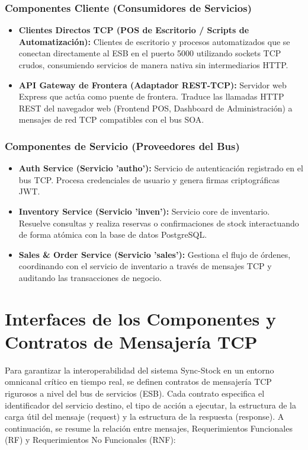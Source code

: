 \documentclass[12pt,a4paper]{article}
\begin{document}
\subsubsection{Componentes Cliente (Consumidores de Servicios)}
\begin{itemize}[leftmargin=*]
    \item \textbf{Clientes Directos TCP (POS de Escritorio / Scripts de Automatización):} Clientes de escritorio y procesos automatizados que se conectan directamente al ESB en el puerto 5000 utilizando sockets TCP crudos, consumiendo servicios de manera nativa sin intermediarios HTTP.
    \item \textbf{API Gateway de Frontera (Adaptador REST-TCP):} Servidor web Express que actúa como puente de frontera. Traduce las llamadas HTTP REST del navegador web (Frontend POS, Dashboard de Administración) a mensajes de red TCP compatibles con el bus SOA.
\end{itemize}

\subsubsection{Componentes de Servicio (Proveedores del Bus)}
\begin{itemize}[leftmargin=*]
    \item \textbf{Auth Service (Servicio 'autho'):} Servicio de autenticación registrado en el bus TCP. Procesa credenciales de usuario y genera firmas criptográficas JWT.
    \item \textbf{Inventory Service (Servicio 'inven'):} Servicio core de inventario. Resuelve consultas y realiza reservas o confirmaciones de stock interactuando de forma atómica con la base de datos PostgreSQL.
    \item \textbf{Sales \& Order Service (Servicio 'sales'):} Gestiona el flujo de órdenes, coordinando con el servicio de inventario a través de mensajes TCP y auditando las transacciones de negocio.
\end{itemize}

\section{Interfaces de los Componentes y Contratos de Mensajería TCP}
Para garantizar la interoperabilidad del sistema Sync-Stock en un entorno omnicanal crítico en tiempo real, se definen contratos de mensajería TCP rigurosos a nivel del bus de servicios (ESB). Cada contrato especifica el identificador del servicio destino, el tipo de acción a ejecutar, la estructura de la carga útil del mensaje (request) y la estructura de la respuesta (response). A continuación, se resume la relación entre mensajes, Requerimientos Funcionales (RF) y Requerimientos No Funcionales (RNF):
\end{document}
